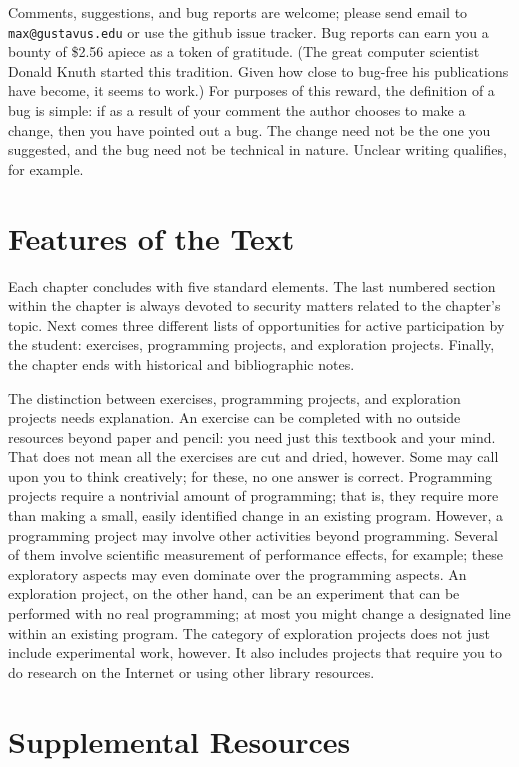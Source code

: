Comments, suggestions, and bug reports are welcome; please send email to
\verb|max@gustavus.edu|
or use the github issue tracker.
Bug reports can earn you a
bounty of \$2.56 apiece as a token of gratitude. (The great computer
scientist Donald Knuth started this tradition.  Given how close to
bug-free his publications have become, it seems to work.)  For
purposes of this reward, the definition of a bug is simple: if as a
result of your comment the author chooses to make a change, then you
have pointed out a bug.  The change need not be the one you suggested,
and the bug need not be technical in nature.  Unclear writing
qualifies, for example.

\section*{Features of the Text}

Each chapter concludes with five standard elements.  The last numbered
section within the chapter is always devoted to security matters
related to the chapter's topic.  Next comes three different lists of
opportunities for active participation by the student: exercises,
programming projects, and exploration projects.  Finally, the chapter
ends with historical and bibliographic notes.

The distinction between exercises, programming projects, and
exploration projects needs explanation.  An exercise can be completed
with no outside resources beyond paper and pencil: you need just this
textbook and your mind.  That does not mean all the exercises are cut
and dried, however.  Some may call upon you to think creatively; for
these, no one answer is correct.  Programming projects require a
nontrivial amount of programming; that is, they require more than
making a small, easily identified change in an existing
program. However, a programming project may involve other activities
beyond programming.  Several of them involve scientific measurement of
performance effects, for example; these exploratory aspects may even
dominate over the programming aspects.  An exploration project, on the
other hand, can be an experiment that can be performed with no real
programming; at most you might change a designated line within an
existing program.  The category of exploration projects does not just
include experimental work, however.  It also includes projects that
require you to do research on the Internet or using other library
resources.

\section*{Supplemental Resources}

